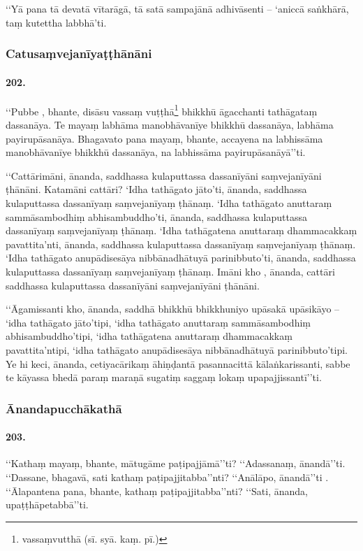 ‘‘Yā pana tā devatā vītarāgā, tā satā sampajānā adhivāsenti – ‘aniccā saṅkhārā, taṃ kutettha labbhā’ti.

\subsubsection{Catusaṃvejanīyaṭṭhānāni}

\paragraph{202.} ‘‘Pubbe , bhante, disāsu vassaṃ vuṭṭhā\footnote{vassaṃvutthā (sī. syā. kaṃ. pī.)} bhikkhū āgacchanti tathāgataṃ dassanāya. Te mayaṃ labhāma manobhāvanīye bhikkhū dassanāya, labhāma payirupāsanāya. Bhagavato pana mayaṃ, bhante, accayena na labhissāma manobhāvanīye bhikkhū dassanāya, na labhissāma payirupāsanāyā’’ti.

‘‘Cattārimāni, ānanda, saddhassa kulaputtassa dassanīyāni saṃvejanīyāni ṭhānāni. Katamāni cattāri? ‘Idha tathāgato jāto’ti, ānanda, saddhassa kulaputtassa dassanīyaṃ saṃvejanīyaṃ ṭhānaṃ. ‘Idha tathāgato anuttaraṃ sammāsambodhiṃ abhisambuddho’ti, ānanda, saddhassa kulaputtassa dassanīyaṃ saṃvejanīyaṃ ṭhānaṃ. ‘Idha tathāgatena anuttaraṃ dhammacakkaṃ pavattita’nti, ānanda, saddhassa kulaputtassa dassanīyaṃ saṃvejanīyaṃ ṭhānaṃ. ‘Idha tathāgato anupādisesāya nibbānadhātuyā parinibbuto’ti, ānanda, saddhassa kulaputtassa dassanīyaṃ saṃvejanīyaṃ ṭhānaṃ. Imāni kho , ānanda, cattāri saddhassa kulaputtassa dassanīyāni saṃvejanīyāni ṭhānāni.

‘‘Āgamissanti kho, ānanda, saddhā bhikkhū bhikkhuniyo upāsakā upāsikāyo – ‘idha tathāgato jāto’tipi, ‘idha tathāgato anuttaraṃ sammāsambodhiṃ abhisambuddho’tipi, ‘idha tathāgatena anuttaraṃ dhammacakkaṃ pavattita’ntipi, ‘idha tathāgato anupādisesāya nibbānadhātuyā parinibbuto’tipi. Ye hi keci, ānanda, cetiyacārikaṃ āhiṇḍantā pasannacittā kālaṅkarissanti, sabbe te kāyassa bhedā paraṃ maraṇā sugatiṃ saggaṃ lokaṃ upapajjissantī’’ti.

\subsubsection{Ānandapucchākathā}

\paragraph{203.} ‘‘Kathaṃ mayaṃ, bhante, mātugāme paṭipajjāmā’’ti? ‘‘Adassanaṃ, ānandā’’ti. ‘‘Dassane, bhagavā, sati kathaṃ paṭipajjitabba’’nti? ‘‘Anālāpo, ānandā’’ti . ‘‘Ālapantena pana, bhante, kathaṃ paṭipajjitabba’’nti? ‘‘Sati, ānanda, upaṭṭhāpetabbā’’ti.

